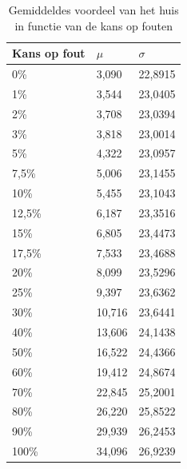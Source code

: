 \documentclass[conference]{IEEEtran}
\begin{document}
\begin{table}[H]
\centering
\begin{tabular}{|l|l|l|}
\hline
Kans op fout & $\mu$ & $\sigma$\\
\hline
0\% & 3,090 & 22,8915\\
1\% & 3,544 & 23,0405\\
2\% & 3,708 & 23,0394\\
3\% & 3,818 & 23,0014\\
5\% & 4,322 & 23,0957\\
7,5\% & 5,006 & 23,1455\\
10\% & 5,455 & 23,1043\\
12,5\% & 6,187 & 23,3516\\
15\% & 6,805 & 23,4473\\
17,5\% & 7,533 & 23,4688\\
20\% & 8,099 & 23,5296\\
25\% & 9,397 & 23,6362\\
30\% & 10,716 & 23,6441\\
40\% & 13,606 & 24,1438\\
50\% & 16,522 & 24,4366\\
60\% & 19,412 & 24,8674\\
70\% & 22,845 & 25,2001\\
80\% & 26,220 & 25,8522\\
90\% & 29,939 & 26,2453\\
100\% & 34,096 & 26,9239\\
\hline
\end{tabular}
\caption{Gemiddeldes voordeel van het huis in functie van de kans op fouten}
\label{tab:gemiddeldesMiskansen}
\end{table}

%
%
\end{document}
